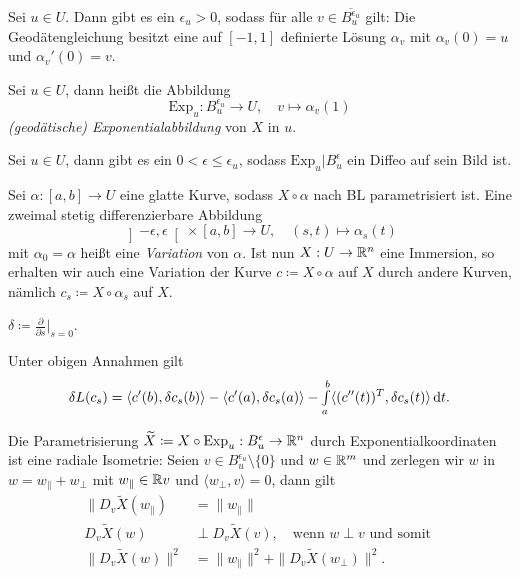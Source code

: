 \documentclass{cheat-sheet}
\newcommand{\Exp}{\mathrm{Exp}} %
\newcommand{\ointervall}[1]{\left]#1\right[} %
\begin{document}
\begin{satz}
  Sei $u \in U$. Dann gibt es ein $\epsilon_u > 0$, sodass für alle $v \in \overline{B_u^{\epsilon_u}}$ gilt: Die Geodätengleichung besitzt eine auf $[-1,1]$ definierte Lösung $\alpha_v$ mit $\alpha_v(0) = u$ und $\alpha_v'(0) = v$.
\end{satz}

\begin{defn}
  Sei $u \in U$, dann heißt die Abbildung
  \[ \Exp_u : B_u^{\epsilon_u} \to U, \quad v \mapsto \alpha_v(1) \]
  \emph{(geodätische) Exponentialabbildung} von $X$ in $u$.
\end{defn}

\begin{defn}
  Sei $u \in U$, dann gibt es ein $0 < \epsilon \leq \epsilon_u$, sodass $\Exp_u|B_u^\epsilon$ ein Diffeo auf sein Bild ist.
\end{defn}

\begin{defn}
  Sei $\alpha : [a, b] \to U$ eine glatte Kurve, sodass $X \circ \alpha$ nach BL parametrisiert ist. Eine zweimal stetig differenzierbare Abbildung
  \[ \ointervall{-\epsilon, \epsilon} \times [a, b] \to U, \quad (s, t) \mapsto \alpha_s(t) \]
  mit $\alpha_0 = \alpha$ heißt eine \emph{Variation} von $\alpha$. Ist nun $X : U \to \mathbb{R}^n$ eine Immersion, so erhalten wir auch eine Variation der Kurve $c \coloneqq X \circ \alpha$ auf $X$ durch andere Kurven, nämlich $c_s \coloneqq X \circ \alpha_s$ auf $X$.
\end{defn}

\begin{nota}
  $\delta \coloneqq \tfrac{\partial}{\partial s}|_{s=0}$.
\end{nota}

\begin{satz}
  Unter obigen Annahmen gilt
  \[ \delta L(c_s) = \langle c'(b), \delta c_s(b) \rangle - \langle c'(a), \delta c_s(a) \rangle - {\textstyle \int\limits_{a}^{b}} \langle (c''(t))^T, \delta c_s(t) \rangle \,\mathrm{d} t. \]
\end{satz}

\begin{satz}[Gaußlemma]
  Die Parametrisierung $\widetilde{X} \coloneqq X \circ \Exp_u : B_u^\epsilon \to \R^n$ durch Exponentialkoordinaten ist eine radiale Isometrie: Seien $v \in B_u^{\epsilon_u} \setminus \{0\}$ und $w \in \mathbb{R}^m$ und zerlegen wir $w$ in $w = w_{\|} + w_\perp$ mit $w_{\|} \in \mathbb{R} v$ und $\langle w_\perp, v \rangle = 0$, dann gilt
  \begin{align*}
    \| D_v \widetilde{X}(w_{\|}) &= \| w_{\|} \|\\
    D_v \widetilde{X}(w) &\perp D_v \widetilde{X}(v), \quad \text{wenn $w \perp v$  und somit }\\
    \| D_v \widetilde{X}(w) \|^2 &= \| w_{\|} \|^2 + \| D_v \widetilde{X}(w_{\perp}) \|^2.
  \end{align*}
\end{satz}
\end{document}
